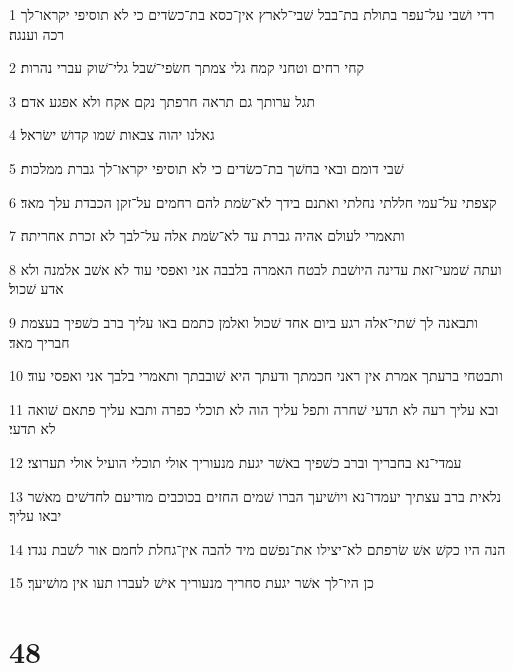 \par 1 רדי ושׁבי על־עפר בתולת בת־בבל שׁבי־לארץ אין־כסא בת־כשׂדים כי לא תוסיפי יקראו־לך רכה וענגה׃
\par 2 קחי רחים וטחני קמח גלי צמתך חשׂפי־שׁבל גלי־שׁוק עברי נהרות׃
\par 3 תגל ערותך גם תראה חרפתך נקם אקח ולא אפגע אדם׃
\par 4 גאלנו יהוה צבאות שׁמו קדושׁ ישׂראל׃
\par 5 שׁבי דומם ובאי בחשׁך בת־כשׂדים כי לא תוסיפי יקראו־לך גברת ממלכות׃
\par 6 קצפתי על־עמי חללתי נחלתי ואתנם בידך לא־שׂמת להם רחמים על־זקן הכבדת עלך מאד׃
\par 7 ותאמרי לעולם אהיה גברת עד לא־שׂמת אלה על־לבך לא זכרת אחריתה׃
\par 8 ועתה שׁמעי־זאת עדינה היושׁבת לבטח האמרה בלבבה אני ואפסי עוד לא אשׁב אלמנה ולא אדע שׁכול׃
\par 9 ותבאנה לך שׁתי־אלה רגע ביום אחד שׁכול ואלמן כתמם באו עליך ברב כשׁפיך בעצמת חבריך מאד׃
\par 10 ותבטחי ברעתך אמרת אין ראני חכמתך ודעתך היא שׁובבתך ותאמרי בלבך אני ואפסי עוד׃
\par 11 ובא עליך רעה לא תדעי שׁחרה ותפל עליך הוה לא תוכלי כפרה ותבא עליך פתאם שׁואה לא תדעי׃
\par 12 עמדי־נא בחבריך וברב כשׁפיך באשׁר יגעת מנעוריך אולי תוכלי הועיל אולי תערוצי׃
\par 13 נלאית ברב עצתיך יעמדו־נא ויושׁיעך הברו שׁמים החזים בכוכבים מודיעם לחדשׁים מאשׁר יבאו עליך׃
\par 14 הנה היו כקשׁ אשׁ שׂרפתם לא־יצילו את־נפשׁם מיד להבה אין־גחלת לחמם אור לשׁבת נגדו׃
\par 15 כן היו־לך אשׁר יגעת סחריך מנעוריך אישׁ לעברו תעו אין מושׁיעך׃

\chapter{48}

